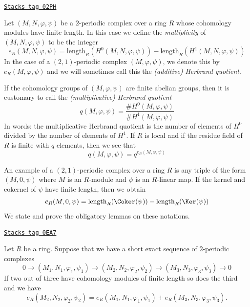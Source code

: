 \begin{definition}
\label{chow-definition-periodic-length}
\href{https://stacks.math.columbia.edu/tag/02PH}{\texttt{Stacks tag 02PH}}

Let $(M, N, \varphi, \psi)$ be a $2$-periodic complex
over a ring $R$ whose cohomology modules have finite length.
In this case we define the {\it multiplicity} of $(M, N, \varphi, \psi)$
to be the integer
$$
e_R(M, N, \varphi, \psi) =
\text{length}_R(H^0(M, N, \varphi, \psi))
-
\text{length}_R(H^1(M, N, \varphi, \psi))
$$
In the case of a $(2, 1)$-periodic complex $(M, \varphi, \psi)$,
we denote this by $e_R(M, \varphi, \psi)$ and we will sometimes call this
the {\it (additive) Herbrand quotient}.
\end{definition}

If the cohomology groups of $(M, \varphi, \psi)$
are finite abelian groups, then it is customary to call the
{\it (multiplicative) Herbrand quotient}
$$
q(M, \varphi, \psi) =
\frac{\# H^0(M, \varphi, \psi)}{\# H^1(M, \varphi, \psi)}
$$
In words: the multiplicative Herbrand quotient is the number of elements of
$H^0$ divided by the number of elements of $H^1$. If $R$ is local and if
the residue field of $R$ is finite with $q$ elements, then we see that
$$
q(M, \varphi, \psi) = q^{e_R(M, \varphi, \psi)}
$$

\medskip\noindent
An example of a $(2, 1)$-periodic complex over a ring $R$ is any triple of
the form $(M, 0, \psi)$ where $M$ is an $R$-module and $\psi$ is an
$R$-linear map. If the kernel and cokernel of $\psi$ have finite length,
then we obtain
\begin{equation}
\label{equation-multiplicity-coker-ker}
e_R(M, 0, \psi) = \text{length}_R(\Coker(\psi)) - \text{length}_R(\Ker(\psi))
\end{equation}
We state and prove the obligatory lemmas on these notations.

\begin{lemma}
\label{chow-lemma-additivity-periodic-length}
\href{https://stacks.math.columbia.edu/tag/0EA7}{\texttt{Stacks tag 0EA7}}

Let $R$ be a ring. Suppose that we have a short exact sequence of
$2$-periodic complexes
$$
0 \to (M_1, N_1, \varphi_1, \psi_1)
\to (M_2, N_2, \varphi_2, \psi_2)
\to (M_3, N_3, \varphi_3, \psi_3)
\to 0
$$
If two out of three have cohomology modules of finite length so does
the third and we have
$$
e_R(M_2, N_2, \varphi_2, \psi_2) =
e_R(M_1, N_1, \varphi_1, \psi_1) +
e_R(M_3, N_3, \varphi_3, \psi_3).
$$
\end{lemma}

